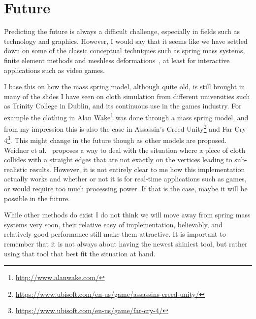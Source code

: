 \chapter{Future}
Predicting the future is always a difficult challenge, especially in fields such as technology and graphics.
However, I would say that it seems like we have settled down on some of the classic conceptual techniques such as spring mass systems, finite element methods and meshless deformations~\cite{muller2005meshless}, at least for interactive applications such as video games. 

I base this on how the mass spring model, although quite old, is still brought in many of the slides I have seen on cloth simulation from different universities such as Trinity College in Dublin\cite{mass_spring_cloth_trinity},
and its continuous use in the games industry.
For example the clothing in Alan Wake\footnote{\url{http://www.alanwake.com/}} was done through a mass spring model\cite{alan_wake_mass_spring}, and from my impression this is also the case
in Assassin's Creed Unity\footnote{\url{https://www.ubisoft.com/en-us/game/assassins-creed-unity/}} and Far Cry 4\footnote{\url{https://www.ubisoft.com/en-us/game/far-cry-4/}}\cite{ubisoft_cloth_simulation}.
This might change in the future though as other models are proposed. Weidner et al.~\cite{weidner_eol} proposes a way to deal with the situation where a piece of cloth collides with a straight edges that are not exactly on the vertices leading to sub-realistic results. 
However, it is not entirely clear to me how this implementation actually works and whether or not it is for real-time applications such as games, or would require too much processing power. 
If that is the case, maybe it will be possible in the future.

While other methods do exist I do not think we will move away from spring mass systems very soon, their relative easy of implementation, believably,
and relatively good performance still make them attractive.
It is important to remember that it is not always about having the newest shiniest tool, but rather using that tool that best fit the situation at hand.





